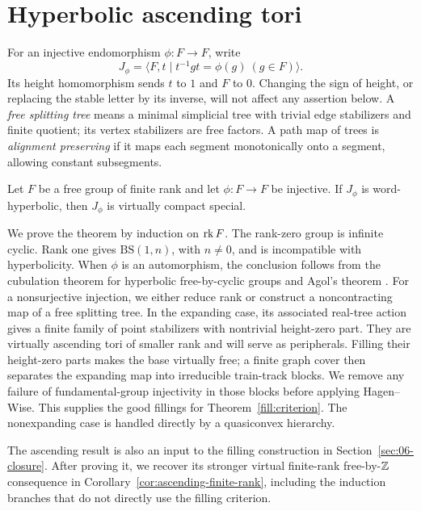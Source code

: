 \section{Hyperbolic ascending tori}\label{sec:02-ascending}

For an injective endomorphism $\phi:F\to F$, write
\[
 J_\phi=\langle F,t\mid t^{-1}gt=\phi(g)\ (g\in F)\rangle.
\]
Its height homomorphism sends $t$ to $1$ and $F$ to $0$.
Changing the sign of height, or replacing the stable letter by its inverse,
will not affect any assertion below. A \emph{free splitting tree} means a
minimal simplicial tree with trivial edge stabilizers and finite quotient;
its vertex stabilizers are free factors. A path map of trees is
\emph{alignment preserving} if it maps each segment monotonically onto a
segment, allowing constant subsegments.

\begin{theorem}\label{asc:vcs}
Let $F$ be a free group of finite rank and let $\phi:F\to F$ be injective.
If $J_\phi$ is word-hyperbolic, then $J_\phi$ is virtually compact special.
\end{theorem}

We prove the theorem by induction on $\operatorname{rk} F$. The rank-zero group is
infinite cyclic. Rank one gives $\mathrm{BS}(1,n)$, with $n\ne0$, and is
incompatible with hyperbolicity. When $\phi$ is an automorphism, the
conclusion follows from the cubulation theorem for hyperbolic
free-by-cyclic groups \cite{HagenWise2016} and Agol's theorem
\cite{Agol2013}. For a nonsurjective injection, we either reduce rank or
construct a noncontracting map of a free splitting tree. In the expanding
case, its associated real-tree action gives a finite family of point
stabilizers with nontrivial height-zero part. They are virtually
ascending tori of smaller rank and will serve as peripherals.
Filling their height-zero parts makes the base virtually free; a finite
graph cover then separates the expanding map into irreducible train-track
blocks. We remove any failure of fundamental-group injectivity in those
blocks before applying Hagen--Wise. This supplies the good fillings for
Theorem~\ref{fill:criterion}. The nonexpanding case is handled directly
by a quasiconvex hierarchy.

The ascending result is also an input to the filling construction in
Section~\ref{sec:06-closure}. After proving it, we recover its stronger
virtual finite-rank free-by-$\mathbb Z$ consequence in
Corollary~\ref{cor:ascending-finite-rank}, including the induction branches
that do not directly use the filling criterion.

